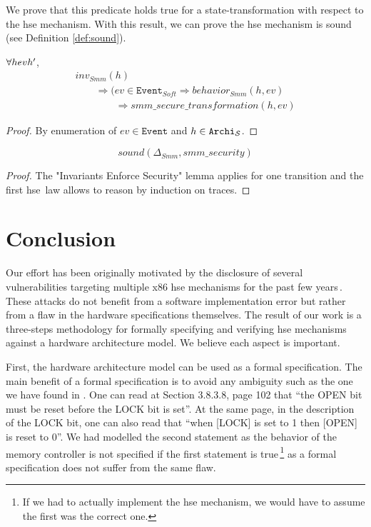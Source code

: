  We prove that this predicate holds true for a state-transformation with respect
 to the \ac{hse} mechanism. With this result, we can prove the \ac{hse}
 mechanism is sound (see Definition \ref{def:sound}).

\begin{lemma}
  $\forall \transitionLTS{Smmx86}{h}{ev}{h'}$,
  \[ \begin{array}{l}
       inv_{Smm}(h) \\
       \qquad \Rightarrow (ev \in \texttt{Event}_{Soft} \Rightarrow
       behavior_{Smm}(h,ev) \\
       \qquad\qquad \Rightarrow smm\_secure\_transformation(h, ev)
     \end{array} \]

  \begin{proof}
    By enumeration of $ev \in \texttt{Event}$ and
    $h \in \texttt{Archi}_{\mathcal{S}}$.
  \end{proof}
\end{lemma}

\begin{theorem}
  \[ sound(\Delta_{Smm}, smm\_security) \]
  \begin{proof}
    The "Invariants Enforce Security" lemma applies for one transition and the
    first \ac{hse} law allows to reason by induction on traces.
  \end{proof}
\end{theorem}


\section{Conclusion}
\label{sec:speccert:discuss}

Our effort has been originally motivated by the disclosure of several
vulnerabilities targeting multiple x86 \ac{hse} mechanisms for the past few
years\,\cite{wojtczuk2009smram,duflot2009smram,rutkowska2008remap,domas2015sinkhole,kallenberg2015racecondition}.
%
These attacks do not benefit from a software implementation error but rather
from a flaw in the hardware specifications themselves.
%
The result of our work is a three-steps methodology for formally specifying and
verifying \ac{hse} mechanisms against a hardware architecture model.
%
We believe each aspect is important.

First, the hardware architecture model can be used as a formal specification.
%
The main benefit of a formal specification is to avoid any ambiguity such as the
one we have found in \cite{intel2009mch}.
%
One can read at Section 3.8.3.8, page 102 that ``the OPEN bit must be reset
before the LOCK bit is set''.
%
At the same page, in the description of the LOCK bit, one can also read that
``when [LOCK] is set to 1 then [OPEN] is reset to 0''.
%
We had modelled the second statement as the behavior of the memory controller is
not specified if the first statement is true\,\footnote{If we had to actually
  implement the \ac{hse} mechanism, we would have to assume the first was the
  correct one.}   as a formal specification does not suffer
from the same flaw.

